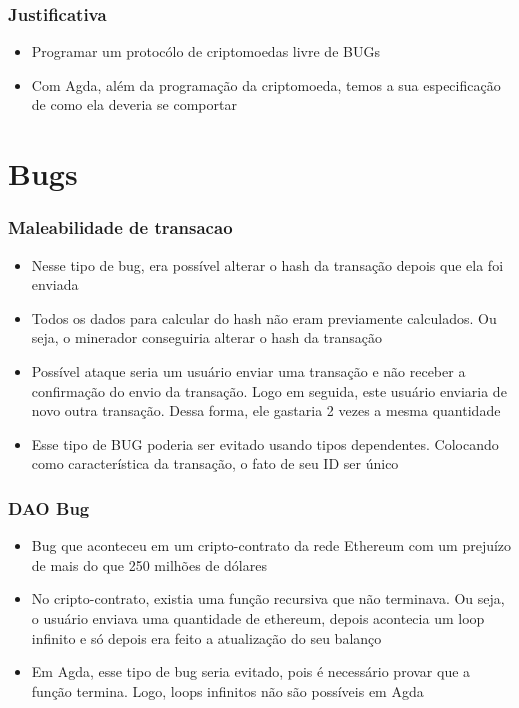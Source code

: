 \documentclass{beamer}
\begin{document}
 \begin{frame}
\frametitle{Justificativa}
\begin{itemize}
    \item Programar um protocólo de criptomoedas livre de BUGs
    \item Com Agda, além da programação da criptomoeda, temos a sua especificação de como ela deveria se comportar
\end{itemize}
\end{frame}

\section{Bugs}

 \begin{frame}
   \frametitle{Maleabilidade de transacao}
\begin{itemize}
  \item Nesse tipo de bug, era possível alterar o hash da transação depois que ela foi enviada
  \item Todos os dados para calcular do hash não eram previamente calculados. Ou seja, o minerador conseguiria alterar o hash da transação
  \item Possível ataque seria um usuário enviar uma transação e não receber a confirmação do envio da transação.
    Logo em seguida, este usuário enviaria de novo outra transação. Dessa forma, ele gastaria 2 vezes a mesma quantidade
  \item Esse tipo de BUG poderia ser evitado usando tipos dependentes. Colocando como característica da transação, o fato de seu ID ser único
\end{itemize}
\end{frame}

\begin{frame}
  \frametitle{DAO Bug}
  \begin{itemize}
    \item Bug que aconteceu em um cripto-contrato da rede Ethereum com um prejuízo de mais do que 250 milhões de dólares
    \item No cripto-contrato, existia uma função recursiva que não terminava. Ou seja, o usuário enviava uma quantidade de ethereum, depois acontecia um loop infinito e só depois era feito a atualização do seu balanço
    \item Em Agda, esse tipo de bug seria evitado, pois é necessário provar que a função termina. Logo, loops infinitos não são possíveis em Agda
  \end{itemize}
\end{frame}
\end{document}
